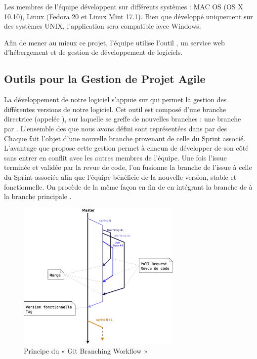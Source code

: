 Les membres de l’équipe développent sur différents systèmes : MAC OS (OS X 10.10), Linux (Fedora 20 et Linux Mint 17.1). Bien que développé uniquement sur des systèmes UNIX, l’application sera compatible avec Windows. 

Afin de mener au mieux ce projet, l’équipe utilise l’outil , un service web d’hébergement et de gestion de développement de logiciels. 

\subsection{Outils pour la Gestion de Projet Agile}
La développement de notre logiciel s’appuie sur  qui permet la gestion des différentes versions de notre logiciel. 
Cet outil est composé d’une branche directrice (appelée ), sur laquelle se greffe de nouvelles branches : une branche par . L’ensemble des  que nous avons défini sont représentées dans  par des . Chaque  fait l’objet d’une nouvelle branche provenant de celle du Sprint associé. L’avantage que propose cette gestion permet à chacun de développer de son côté sans entrer en conflit avec les autres membres de l’équipe. Une fois l’issue terminée et validée par la revue de code, l’on fusionne la branche de l’issue à celle du Sprint associée afin que l’équipe bénéficie de la nouvelle version, stable et fonctionnelle. On procède de la même façon en fin de  en intégrant la branche de  à la branche principale .

\begin{figure}[H]
	\centering
	\includegraphics*[width=8cm]{screens/BranchingWorkflow.eps}
	\caption{Principe du « Git Branching Workflow »}
\end{figure}

